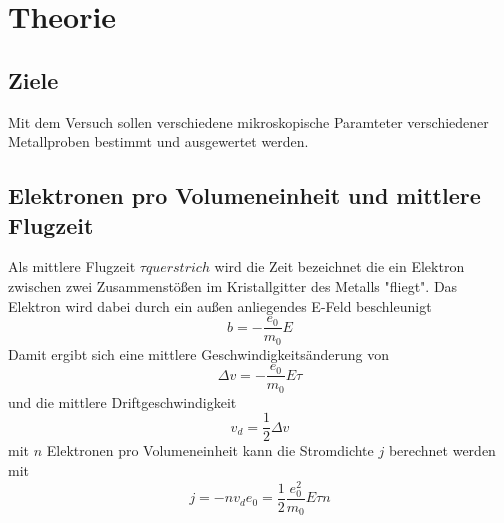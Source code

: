 \newpage
\section{Theorie}
\label{sec:theorie}
\subsection{Ziele}
Mit dem Versuch sollen verschiedene mikroskopische Paramteter verschiedener Metallproben bestimmt und ausgewertet werden.
\subsection{Elektronen pro Volumeneinheit und mittlere Flugzeit}
Als mittlere Flugzeit $\tau querstrich$ wird die Zeit bezeichnet die ein Elektron zwischen zwei Zusammenstößen im Kristallgitter des Metalls "fliegt".
Das Elektron wird dabei durch ein außen anliegendes E-Feld beschleunigt
\begin{equation*}
     b = - \frac{e_0}{m_0} E %
\end{equation*} 
Damit ergibt sich eine mittlere Geschwindigkeitsänderung von 
\begin{equation*}
    \Delta v = -\frac{e_0}{m_0} E \tau %
\end{equation*}
und die mittlere Driftgeschwindigkeit 
\begin{equation*}
     v_d = \frac{1}{2}\Delta v %
\end{equation*}
mit $n$ Elektronen pro Volumeneinheit kann die Stromdichte $j$ berechnet werden mit
\begin{equation*}
    j = -n v_d e_0 = \frac{1}{2} \frac{e_0^2}{m_0} E \tau n%
\end{equation*}


